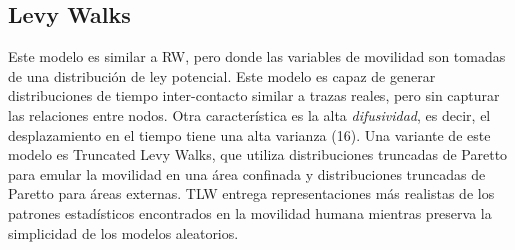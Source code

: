 \subsection{Levy Walks}
Este modelo es similar a RW, pero donde las variables de movilidad son tomadas de una distribución de ley potencial. Este modelo es capaz de generar distribuciones de tiempo inter-contacto similar a trazas reales, pero sin capturar las relaciones entre nodos. Otra característica es la alta \emph{difusividad}, es decir, el desplazamiento en el tiempo tiene una alta varianza (16). Una variante de este modelo es Truncated Levy Walks, que utiliza distribuciones truncadas de Paretto para emular la movilidad en una área confinada y distribuciones truncadas de Paretto para áreas externas. TLW entrega representaciones más realistas de los patrones estadísticos encontrados en la movilidad humana mientras preserva la simplicidad de los modelos aleatorios.
